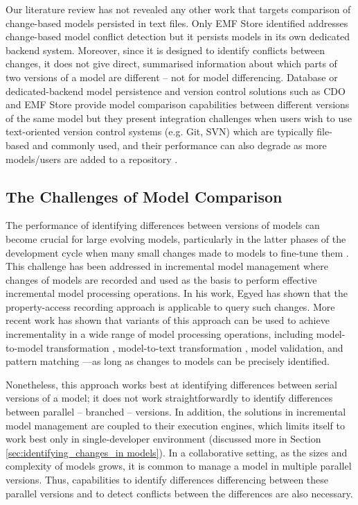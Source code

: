 Our literature review has not revealed any other work that targets comparison of change-based models persisted in text files. Only EMF Store \cite{koegel2010emfstore} identified addresses change-based model conflict detection but it persists models in its own dedicated backend system. Moreover, since it is designed to identify conflicts between changes, it does not give direct, summarised information about which parts of two versions of a model are different -- not for model differencing. Database or dedicated-backend model persistence and version control solutions such as CDO \cite{eclipse2019cdo} and EMF Store provide model comparison capabilities between different versions of the same model but they present integration challenges when users wish to use text-oriented version control systems (e.g. Git, SVN) which are typically file-based and commonly used, and their performance can also degrade as more models/users are added to a repository \cite{KolovosRMPGCLRV13}.

\subsection{The Challenges of Model Comparison}
\label{sec:the_key_challenge_of_incrementality}

The performance of identifying differences between versions of models can become crucial for large evolving models, particularly in the latter phases of the development cycle when many small changes made to models to fine-tune them \cite{selic2003pragmatics}. This challenge has been addressed in incremental model management where changes of models are recorded and used as the basis to perform effective incremental model processing operations. In his work, Egyed \cite{egyed2011automatically} has shown that the property-access recording approach is applicable to query such changes. More recent work has shown that variants of this approach can be used to achieve incrementality in a wide range of model processing operations, including model-to-model transformation \cite{jouault2010towards}, model-to-text transformation \cite{DBLP:conf/ecmdafa/OgunyomiRK15}, model validation, and pattern matching \cite{DBLP:conf/ecmdafa/RathHV12}---as long as changes to models can be precisely identified.  

Nonetheless, this approach works best at identifying differences between serial versions of a model; it does not work straightforwardly to identify differences between parallel -- branched -- versions. In addition, the solutions in incremental model management are coupled to their execution engines, which limits itself to work best only in single-developer environment (discussed more in Section \ref{sec:identifying_changes_in models}). In a collaborative setting, as the sizes and complexity of models grows, it is common to manage a model in multiple parallel versions. Thus, capabilities to identify differences differencing between these parallel versions and to detect conflicts between the differences are also necessary.

